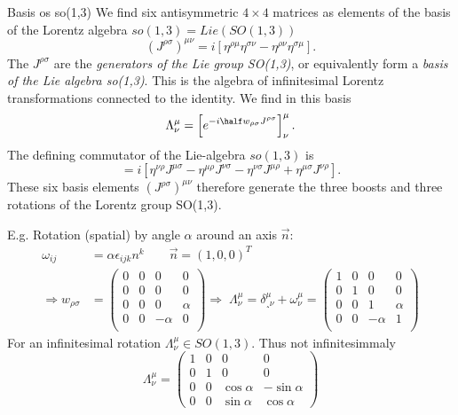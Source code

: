 \begin{mybox}{Basis os so(1,3)}
	We find six antisymmetric $4\times4$ matrices as elements of the basis of the Lorentz algebra $so(1,3)=Lie(SO(1,3))$
	\begin{equation}
		(J^{\rho  \sigma})^{\mu \nu} = i \left[\eta^{\rho \mu} \eta^{\sigma \nu} - \eta^{\rho \nu} \eta^{\sigma \mu} \right].
	\end{equation}
	The $J^{\rho \sigma}$ are the \emph{generators of the Lie group SO(1,3)}, or equivalently form a \emph{basis of the Lie algebra so(1,3)}. This is the algebra of infinitesimal Lorentz transformations connected to the identity. We find in this basis
	\begin{equation}
		\Lambda^{\mu}_{\nu} = \left[e^{-i \half w_{\rho \sigma }J^{\rho \sigma}  }\right]^{\mu}_{\nu}.
	\end{equation}
	The defining commutator of the Lie-algebra $so(1,3)$ is 
	\begin{equation}
		[J^{\mu \nu}, J^{\rho \sigma} ] = i \left[\eta^{\nu \rho} J^{\mu \sigma} - \eta^{\mu \rho} J^{\nu \sigma} - \eta^{\nu \sigma} J^{\mu \rho} + \eta^{\mu \sigma} J^{\nu \rho}\right].
	\end{equation}
	These six basis elements $(J^{\rho \sigma})^{\mu \nu}$ therefore generate the three boosts and three rotations of the Lorentz group SO(1,3).
\end{mybox}

E.g. Rotation (spatial) by angle $\alpha$ around an axis $\vec{n}$:
\begin{align*}
	\omega_{ij} &= \alpha \epsilon_{ijk} n^k \qquad \vec{n} = (1,0,0)^T\\
	\Rightarrow 	w_{\rho \sigma} &=
	\begin{pmatrix}
	0&0&0&0\\
	0&0&0&0 \\
	0&0&0&\alpha \\
	0&0&-\alpha &0\\
	\end{pmatrix}
\Rightarrow \; \Lambda^{\mu}_{\nu} = \delta^{\mu}_{¸\nu} + \omega^{\mu}_{\nu} = 
\begin{pmatrix}
	1 &0&0&0\\
	0&1&0&0 \\
	0&0&1&\alpha \\
	0&0&-\alpha &1 \\
\end{pmatrix}
\end{align*}
For an infinitesimal rotation $\Lambda^{\mu}_{\nu} \in SO(1,3)$. Thus not infinitesimmaly
\begin{equation}
	\Lambda^{\mu}_{\nu} = 
	\begin{pmatrix}
	1&0&0&0\\
	0&1&0&0 \\
	0&0& \cos \alpha & -\sin \alpha \\
	0&0& \sin\alpha & \cos \alpha
	\end{pmatrix}
\end{equation}
